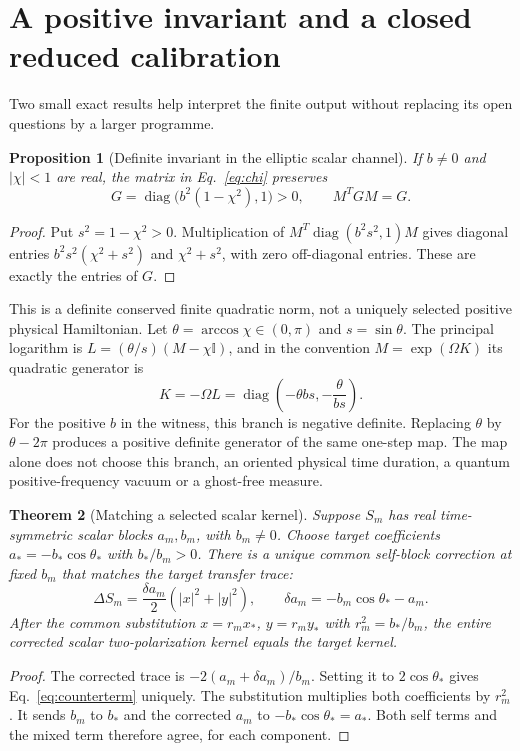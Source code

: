 \documentclass[11pt]{article}
\newtheorem{theorem}{Theorem}[section]
\newtheorem{proposition}[theorem]{Proposition}
\theoremstyle{remark}\newtheorem{remark}[theorem]{Remark}
\DeclareMathOperator{\diag}{diag}
\newcommand{\Id}{\mathbb I}
\begin{document}
\section{A positive invariant and a closed reduced calibration}
\label{sec:repair}
Two small exact results help interpret the finite output without replacing its open questions by a larger programme.

\begin{proposition}[Definite invariant in the elliptic scalar channel]
If $b\ne0$ and $|\chi|<1$ are real, the matrix in Eq.~\eqref{eq:chi} preserves
\begin{equation}
G=\diag\bigl(b^2(1-\chi^2),1\bigr)>0,
\qquad M^TGM=G.
\label{eq:positiveG}
\end{equation}
\end{proposition}
\begin{proof}
Put $s^2=1-\chi^2>0$.
Multiplication of $M^T\diag(b^2s^2,1)M$ gives diagonal entries $b^2s^2(\chi^2+s^2)$ and $\chi^2+s^2$, with zero off-diagonal entries.
These are exactly the entries of $G$.
\end{proof}

This is a definite conserved finite quadratic norm, not a uniquely selected positive physical Hamiltonian.
Let $\theta=\arccos\chi\in(0,\pi)$ and $s=\sin\theta$.
The principal logarithm is $L=(\theta/s)(M-\chi\Id)$, and in the convention $M=\exp(\Omega K)$ its quadratic generator is
\begin{equation}
K=-\Omega L=
\diag\left(-\theta b s,-\frac{\theta}{bs}\right).
\label{eq:log}
\end{equation}
For the positive $b$ in the witness, this branch is negative definite.
Replacing $\theta$ by $\theta-2\pi$ produces a positive definite generator of the same one-step map.
The map alone does not choose this branch, an oriented physical time duration, a quantum positive-frequency vacuum or a ghost-free measure.

\begin{theorem}[Matching a selected scalar kernel]
\label{thm:repair}
Suppose $S_m$ has real time-symmetric scalar blocks $a_m,b_m$, with $b_m\ne0$.
Choose target coefficients $a_*=-b_*\cos\theta_*$ with $b_*/b_m>0$.
There is a unique common self-block correction at fixed $b_m$ that matches the target transfer trace:
\begin{equation}
\Delta S_m=\frac{\delta a_m}{2}(|x|^2+|y|^2),
\qquad\delta a_m=-b_m\cos\theta_*-a_m.
\label{eq:counterterm}
\end{equation}
After the common substitution $x=r_mx_*$, $y=r_my_*$ with $r_m^2=b_*/b_m$, the entire corrected scalar two-polarization kernel equals the target kernel.
\end{theorem}
\begin{proof}
The corrected trace is $-2(a_m+\delta a_m)/b_m$.
Setting it to $2\cos\theta_*$ gives Eq.~\eqref{eq:counterterm} uniquely.
The substitution multiplies both coefficients by $r_m^2$.
It sends $b_m$ to $b_*$ and the corrected $a_m$ to $-b_*\cos\theta_*=a_*$.
Both self terms and the mixed term therefore agree, for each component.
\end{proof}
\end{document}
